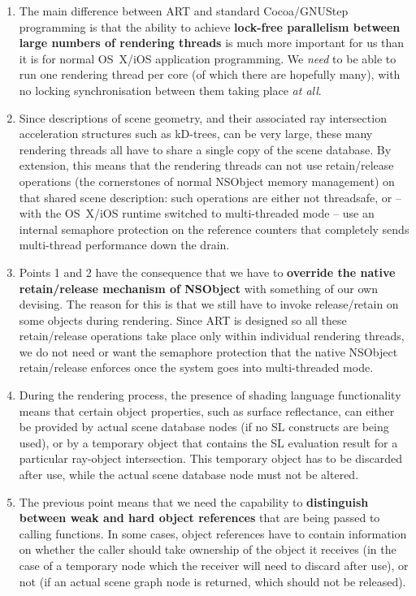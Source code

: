 \begin{enumerate}
\item The main difference between ART and standard Cocoa/GNUStep programming is that the ability to achieve \textbf{lock-free parallelism between large numbers of rendering threads} is much more important for us than it is for normal OS~X/iOS application programming. We \textit{need} to be able to run one rendering thread per core (of which there are hopefully many), with no locking synchronisation between them taking place \textit{at all}.
\item Since descriptions of scene geometry, and their associated ray intersection acceleration structures such as kD-trees, can be very large, these many rendering threads all have to share a single copy of the scene database. By extension, this means that the rendering threads can not use retain/release operations (\ie the cornerstones of normal NSObject memory management) on that shared scene description: such operations are either not threadsafe, or -- with the OS~X/iOS runtime switched to multi-threaded mode -- use an internal semaphore protection on the reference counters that completely sends multi-thread performance down the drain.
\item Points 1 and 2 have the consequence that we have to \textbf{override the native retain/release mechanism of NSObject} with something of our own devising. The reason for this is that we still have to invoke release/retain on some objects during rendering. Since ART is designed so all these retain/release operations take place only within individual rendering threads, we do not need or want the semaphore protection that the native NSObject retain/release enforces once the system goes into multi-threaded mode.
\item During the rendering process, the presence of shading language functionality means that certain object properties, such as surface reflectance, can either be provided by actual scene database nodes (if no SL constructs are being used), or by a temporary object that contains the SL evaluation result for a particular ray-object intersection. This temporary object has to be discarded after use, while the actual scene database node must not be altered.
\item The previous point means that we need the capability to \textbf{distinguish between weak and hard object references} that are being passed to calling functions. In some cases, object references have to contain information on whether the caller should take ownership of the object it receives (in the case of a temporary node which the receiver will need to discard after use), or not (if an actual scene graph node is returned, which should not be released).
\end{enumerate}

